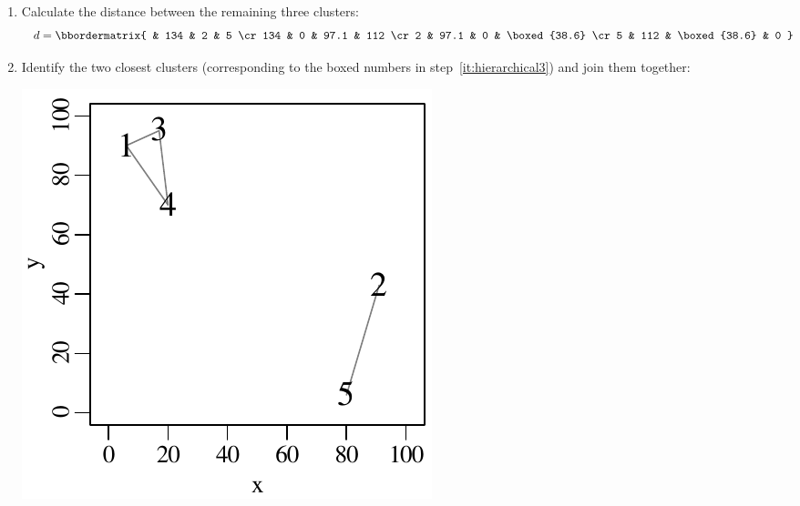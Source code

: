\begin{enumerate}
\item\label{it:hierarchical3} Calculate the distance between the
  remaining three clusters:
  \begin{equation*}
    d = \bbordermatrix{ & 134 & 2 & 5 \cr
      134 & 0 & 97.1 & 112 \cr
      2 & 97.1 & 0 & \boxed{38.6} \cr
      5 & 112 & \boxed{38.6} & 0
    }
  \end{equation*}  
  
\item Identify the two closest clusters (corresponding to the boxed
  numbers in step~\ref{it:hierarchical3}) and join them together:

  \begin{minipage}[t][][b]{.3\linewidth}
  \includegraphics[width=\linewidth]{../figures/hierarchical4.pdf}\medskip
  \end{minipage}
  \begin{minipage}[t][][b]{.3\linewidth}

\end{minipage}
\end{enumerate}

